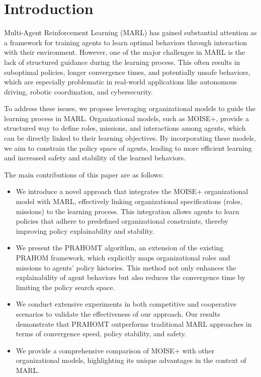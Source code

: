 \documentclass[sigconf,anonymous]{aamas}
\begin{document}

\section{Introduction}

Multi-Agent Reinforcement Learning (MARL) has gained substantial attention as a framework for training agents to learn optimal behaviors through interaction with their environment. However, one of the major challenges in MARL is the lack of structured guidance during the learning process. This often results in suboptimal policies, longer convergence times, and potentially unsafe behaviors, which are especially problematic in real-world applications like autonomous driving, robotic coordination, and cybersecurity.

To address these issues, we propose leveraging organizational models to guide the learning process in MARL. Organizational models, such as MOISE+, provide a structured way to define roles, missions, and interactions among agents, which can be directly linked to their learning objectives. By incorporating these models, we aim to constrain the policy space of agents, leading to more efficient learning and increased safety and stability of the learned behaviors.

The main contributions of this paper are as follows:

\begin{itemize}
    \item We introduce a novel approach that integrates the MOISE+ organizational model with MARL, effectively linking organizational specifications (roles, missions) to the learning process. This integration allows agents to learn policies that adhere to predefined organizational constraints, thereby improving policy explainability and stability.
    \item We present the PRAHOMT algorithm, an extension of the existing PRAHOM framework, which explicitly maps organizational roles and missions to agents' policy histories. This method not only enhances the explainability of agent behaviors but also reduces the convergence time by limiting the policy search space.
    \item We conduct extensive experiments in both competitive and cooperative scenarios to validate the effectiveness of our approach. Our results demonstrate that PRAHOMT outperforms traditional MARL approaches in terms of convergence speed, policy stability, and safety.
    \item We provide a comprehensive comparison of MOISE+ with other organizational models, highlighting its unique advantages in the context of MARL.
\end{itemize}
\end{document}
